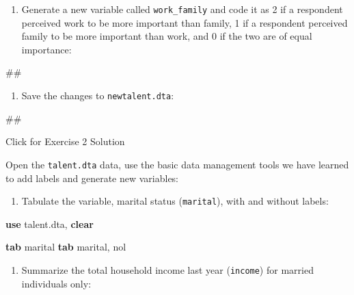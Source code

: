 \documentclass[
]{book}
\newenvironment{Shaded}{\begin{snugshade}}{\end{snugshade}}
\newcommand{\KeywordTok}[1]{\textcolor[rgb]{0.13,0.29,0.53}{\textbf{#1}}}
\newcommand{\NormalTok}[1]{#1}
\providecommand{\tightlist}{%
  \setlength{\itemsep}{0pt}\setlength{\parskip}{0pt}}
\begin{document}
\begin{enumerate}
\def\labelenumi{\arabic{enumi}.}
\setcounter{enumi}{6}
\tightlist
\item
  Generate a new variable called \texttt{work\_family} and code it as 2 if a respondent perceived work to be more important than family, 1 if a respondent perceived family to be more important than work, and 0 if the two are of equal importance:
\end{enumerate}

\begin{Shaded}
\begin{Highlighting}[]
\NormalTok{\#\#}
\end{Highlighting}
\end{Shaded}

\begin{enumerate}
\def\labelenumi{\arabic{enumi}.}
\setcounter{enumi}{7}
\tightlist
\item
  Save the changes to \texttt{newtalent.dta}:
\end{enumerate}

\begin{Shaded}
\begin{Highlighting}[]
\NormalTok{\#\#}
\end{Highlighting}
\end{Shaded}

{Click for Exercise 2 Solution}

Open the \texttt{talent.dta} data, use the basic data management tools we have learned to add labels and generate new variables:

\begin{enumerate}
\def\labelenumi{\arabic{enumi}.}
\tightlist
\item
  Tabulate the variable, marital status (\texttt{marital}), with and without labels:
\end{enumerate}

\begin{Shaded}
\begin{Highlighting}[]
\KeywordTok{use}\NormalTok{ talent.dta, }\KeywordTok{clear}

\KeywordTok{tab}\NormalTok{ marital}
\KeywordTok{tab}\NormalTok{ marital, nol }
\end{Highlighting}
\end{Shaded}

\begin{enumerate}
\def\labelenumi{\arabic{enumi}.}
\setcounter{enumi}{1}
\tightlist
\item
  Summarize the total household income last year (\texttt{income}) for married individuals only:
\end{enumerate}
\end{document}
